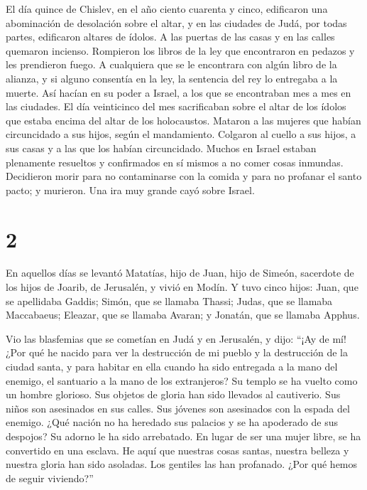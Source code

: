  El día quince de Chislev, en el año ciento cuarenta y
cinco, edificaron una abominación de desolación sobre el altar, y en las
ciudades de Judá, por todas partes, edificaron altares de ídolos.
 A las puertas de las casas y en las calles quemaron
incienso.  Rompieron los libros de la ley que encontraron
en pedazos y les prendieron fuego.  A cualquiera que se
le encontrara con algún libro de la alianza, y si alguno consentía en la
ley, la sentencia del rey lo entregaba a la muerte.  Así
hacían en su poder a Israel, a los que se encontraban mes a mes en las
ciudades.  El día veinticinco del mes sacrificaban sobre
el altar de los ídolos que estaba encima del altar de los holocaustos.
 Mataron a las mujeres que habían circuncidado a sus
hijos, según el mandamiento.  Colgaron al cuello a sus
hijos, a sus casas y a las que los habían circuncidado. 
Muchos en Israel estaban plenamente resueltos y confirmados en sí mismos
a no comer cosas inmundas.  Decidieron morir para no
contaminarse con la comida y para no profanar el santo pacto; y
murieron.  Una ira muy grande cayó sobre Israel.

\hypertarget{section-1}{%
\section{2}\label{section-1}}

 En aquellos días se levantó Matatías, hijo de Juan, hijo
de Simeón, sacerdote de los hijos de Joarib, de Jerusalén, y vivió en
Modín.  Y tuvo cinco hijos: Juan, que se apellidaba
Gaddis;  Simón, que se llamaba Thassi; 
Judas, que se llamaba Maccabaeus;  Eleazar, que se llamaba
Avaran; y Jonatán, que se llamaba Apphus.

 Vio las blasfemias que se cometían en Judá y en
Jerusalén,  y dijo: ``¡Ay de mí! ¿Por qué he nacido para
ver la destrucción de mi pueblo y la destrucción de la ciudad santa, y
para habitar en ella cuando ha sido entregada a la mano del enemigo, el
santuario a la mano de los extranjeros?  Su templo se ha
vuelto como un hombre glorioso.  Sus objetos de gloria han
sido llevados al cautiverio. Sus niños son asesinados en sus calles. Sus
jóvenes son asesinados con la espada del enemigo.  ¿Qué
nación no ha heredado sus palacios y se ha apoderado de sus despojos?
 Su adorno le ha sido arrebatado. En lugar de ser una
mujer libre, se ha convertido en una esclava.  He aquí
que nuestras cosas santas, nuestra belleza y nuestra gloria han sido
asoladas. Los gentiles las han profanado.  ¿Por qué hemos
de seguir viviendo?''

